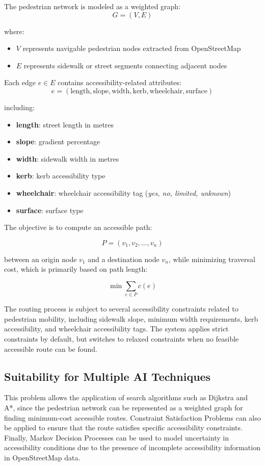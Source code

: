 \documentclass[letterpaper]{article} %
\begin{document}
The pedestrian network is modeled as a weighted graph:
\[
G = (V,E)
\]

where:
\begin{itemize}

    \item \(V\) represents navigable pedestrian nodes extracted from OpenStreetMap
    
    \item \(E\) represents sidewalk or street segments connecting adjacent nodes
    
\end{itemize}

Each edge \(e \in E\) contains accessibility-related attributes:
\[
e = (\text{length}, \text{slope}, \text{width}, \text{kerb}, \text{wheelchair}, \text{surface})
\]

including:
\begin{itemize}
    \item \textbf{length}: street length in metres
    \item \textbf{slope}: gradient percentage
    \item \textbf{width}: sidewalk width in metres
    \item \textbf{kerb}: kerb accessibility type
    \item \textbf{wheelchair}: wheelchair accessibility tag (\textit{yes, no, limited, unknown})
    \item \textbf{surface}: surface type
\end{itemize}

The objective is to compute an accessible path:

\[
P = (v_1,v_2,\dots,v_n)
\]

between an origin node \(v_1\) and a destination node \(v_n\), while minimizing traversal cost, which is primarily based on path length:

\[
\min \sum_{e \in P} c(e)
\]

The routing process is subject to several accessibility constraints related to pedestrian mobility, including sidewalk slope, minimum width requirements, kerb accessibility, and wheelchair accessibility tags. The system applies strict constraints by default, but switches to relaxed constraints when no feasible accessible route can be found.

\subsection{Suitability for Multiple AI Techniques}
This problem allows the application of search algorithms such as Dijkstra and A*, since the pedestrian network can be represented as a weighted graph for finding minimum-cost accessible routes. Constraint Satisfaction Problems can also be applied to ensure that the route satisfies specific accessibility constraints. Finally, Markov Decision Processes can be used to model uncertainty in accessibility conditions due to the presence of incomplete accessibility information in OpenStreetMap data.
\end{document}
